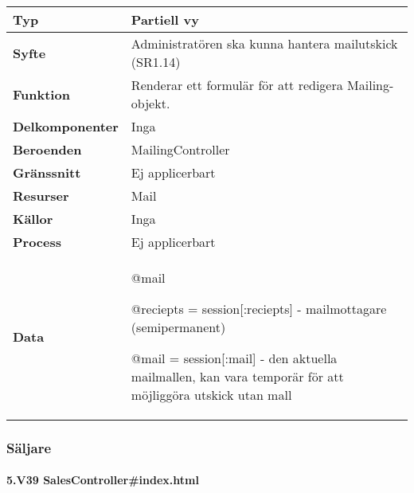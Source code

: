 \documentclass[a4paper, twoside, 11pt, titlepage]{article}
\begin{document}
			\begin {table} [ht] \begin{tabular} {  p{3.5cm} p{11.6cm} }
				\hline
				{\sffamily\textbf{Typ}} & {Partiell vy} \\
				\hline
				{\sffamily\textbf{Syfte}} & {Administratören ska kunna hantera mailutskick (SR1.14)} \\
				\hline
				{\sffamily\textbf{Funktion}} & {Renderar ett formulär för att redigera Mailing-objekt.} \\
				\hline
				{\sffamily\textbf{Delkomponenter}} & {Inga} \\
				\hline
				{\sffamily\textbf{Beroenden}} & {MailingController} \\
				\hline
				{\sffamily\textbf{Gränssnitt}} & {Ej applicerbart} \\
				\hline
				{\sffamily\textbf{Resurser}} & {Mail} \\
				\hline
				{\sffamily\textbf{Källor}} & {Inga} \\
				\hline
				{\sffamily\textbf{Process}} & {Ej applicerbart} \\
				\hline
				{\sffamily\textbf{Data}} & {@mail

@reciepts = session[:reciepts] - mailmottagare (semipermanent)

@mail = session[:mail] - den aktuella mailmallen, kan vara temporär för att möjliggöra utskick utan mall} \\
				\hline
			\end{tabular} \end{table} \FloatBarrier


		\subsubsection{Säljare}



			\paragraph{5.V39 SalesController\#index.html}\
\end{document}
